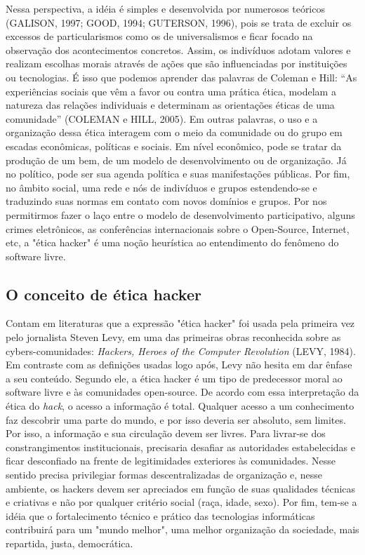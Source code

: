Nessa perspectiva, a idéia é simples e desenvolvida por numerosos teóricos (GALISON, 1997; GOOD, 1994; GUTERSON, 1996), pois se trata de excluir os excessos de particularismos como os de universalismos e ficar focado na observação dos acontecimentos concretos. Assim, os indivíduos adotam valores e realizam escolhas morais através de ações que são influenciadas por instituições ou tecnologias. É isso que podemos aprender das palavras de Coleman e Hill: “As experiências sociais que vêm a favor ou contra uma prática ética, modelam a natureza das relações individuais e determinam as orientações éticas de uma comunidade” (COLEMAN e HILL, 2005). Em outras palavras, o uso e a organização dessa ética interagem com o meio da comunidade ou do grupo em escadas econômicas, políticas e sociais. Em nível econômico, pode se tratar da produção de um bem, de um modelo de desenvolvimento ou de organização. Já no político, pode ser sua agenda política e suas manifestações públicas. Por fim, no âmbito social, uma rede e nós de indivíduos e grupos estendendo-se e traduzindo suas normas em contato com novos domínios e grupos. Por nos permitirmos fazer o laço entre o modelo de desenvolvimento participativo, alguns crimes eletrônicos, as conferências internacionais sobre o Open-Source, Internet, etc, a "ética hacker" é uma noção heurística ao entendimento do fenômeno do software livre.

\subsection{O conceito de ética hacker} \label{2.1.3}

Contam em literaturas que a expressão "ética hacker" foi usada pela primeira vez pelo jornalista Steven Levy, em uma das primeiras obras reconhecida sobre as cybers-comunidades: \emph{Hackers, Heroes of the Computer Revolution} (LEVY, 1984). Em contraste com as definições usadas logo após, Levy não hesita em dar ênfase a seu conteúdo. Segundo ele, a ética hacker é um tipo de predecessor moral ao software livre e às comunidades open-source. De acordo com essa interpretação da ética do \emph{hack}, o acesso a informação é total. Qualquer acesso a um conhecimento faz descobrir uma parte do mundo, e por isso deveria ser absoluto, sem limites. Por isso, a informação e sua circulação devem ser livres. Para livrar-se dos constrangimentos institucionais, precisaria desafiar as autoridades estabelecidas e ficar desconfiado na frente de legitimidades exteriores às comunidades. Nesse sentido precisa privilegiar formas descentralizadas de organização e, nesse ambiente, os hackers devem ser apreciados em função de suas qualidades técnicas e criativas e não por qualquer critério social (raça, idade, sexo). Por fim, tem-se a idéia que o fortalecimento técnico e prático das tecnologias informáticas contribuirá para um "mundo melhor", uma melhor organização da sociedade, mais repartida, justa, democrática.

